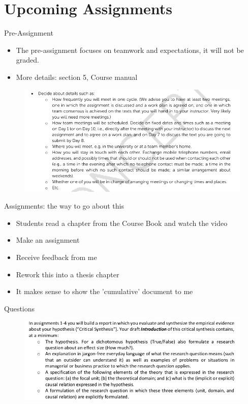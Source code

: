 \documentclass[aspectratio = 169, 12pt]{beamer}
\begin{document}
\section{Upcoming Assignments}
    \begin{frame}{Pre-Assignment}
        \begin{itemize}
            \item The pre-assignment focuses on teamwork and expectations, it will not be graded.
            \item More details: section 5, Course manual
        \end{itemize}
        \begin{figure}
            \centering
            \includegraphics[width = 0.8 \textwidth]{screen6.png}
            \label{fig:my_label}
        \end{figure}
    \end{frame}

    \begin{frame}{Assignments: the way to go about this}
        \begin{itemize}
            \item Students read a chapter from the Course Book and watch the video
            \item Make an assignment
            \item Receive feedback from me
            \item Rework this into a thesis chapter
            \item It makes sense to show the 'cumulative' document to me
        \end{itemize}
    \end{frame}
    
    \begin{frame}{Questions}
        \begin{figure}
            \centering
            \includegraphics[width = 1.0\textwidth]{screen2.png}
            \label{fig:my_label}
        \end{figure}
    \end{frame}
    
\end{document}
